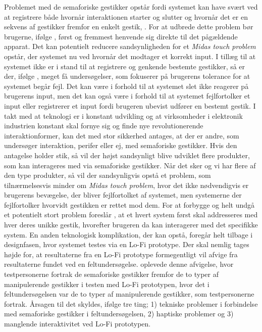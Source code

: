 Problemet med de semaforiske gestikker opstår fordi systemet kan have svært ved at registrere både hvornår interaktionen starter og slutter og hvornår det er en sekvens af gestikker fremfor en enkelt gestik, \parencite[s. 27]{PDF:ATaxonomyOfGestures}. For at udbrede dette problem bør brugerne, ifølge \textcite[s. 1]{PDF:DoThatThere}, først og fremmest henvende sig direkte til det pågældende apparat. Det kan potentielt reducere sandsynligheden for et \textit{Midas touch problem} opstår, der systemet nu ved hvornår det modtager et korrekt input. I tillæg til at systemet ikke er i stand til at registrere og genkende bestemte gestikker, så er der, ifølge \textcite[s. 37]{PDF:ATaxonomyOfGestures}, meget få undersøgelser, som fokuserer på brugerens tolerance for at systemet begår fejl. Det kan være i forhold til at systemet slet ikke reagerer på brugerens input, men det kan også være i forhold til at systemet fejlfortolker et input eller registrerer et input fordi brugeren ubevist udfører en bestemt gestik. \blankline
%
I takt med at teknologi er i konstant udvikling og at virksomheder i elektronik industrien konstant skal fornye sig og finde nye revolutionerende interaktionformer, kan det med stor sikkerhed antages, at der er andre, som undersøger interaktion, perifer eller ej, med semaforiske gestikker. Hvis den antagelse holder stik, så vil der højst sandsynligt blive udviklet flere produkter, som kan interageres med via semaforiske gestikker. Når det sker og vi har flere af den type produkter, så vil der sandsynligvis opstå et problem, som tilnærmelsesvis minder om \textit{Midas touch problem}, hvor det ikke nødvendigvis er brugerens bevægelse, der bliver fejlfortolket af systemet, men systemerne der fejlfortolker hvorvidt gestikken er rettet mod dem. For at forbygge og helt undgå et potentielt stort problem foreslår \textcite[s. 2]{PDF:DoThatThere}, at et hvert system først skal addresseres med hver deres unikke gestik, hvorefter brugeren da kan interagerer med det specifikke system. \blankline
%        
En anden teknologisk komplikation, der kan opstå, foregår helt tilbage i designfasen, hvor systemet testes via en Lo-Fi prototype. Der skal nemlig tages højde for, at resultaterne fra en Lo-Fi prototype formegentligt vil afvige fra resultaterne fundet ved en feltundersøgelse. \textcite[s. 176]{PDF:ComparingInputModalities} oplevede denne afvigelse, hvor testpersonerne fortrak de semaforiske gestikker fremfor de to typer af manipulerende gestikker i testen med Lo-Fi prototypen, hvor det i feltundersøgelsen var de to typer af manipulerende gestikker, som testpersonerne fortrak. Årsagen til det skyldes, ifølge \textcite[s. 176]{PDF:ComparingInputModalities} tre ting; 1) tekniske problemer i forbindelse med semaforiske gestikker i feltundersøgelsen, 2) haptiske problemer og 3) manglende interaktivitet ved Lo-Fi prototypen. 

